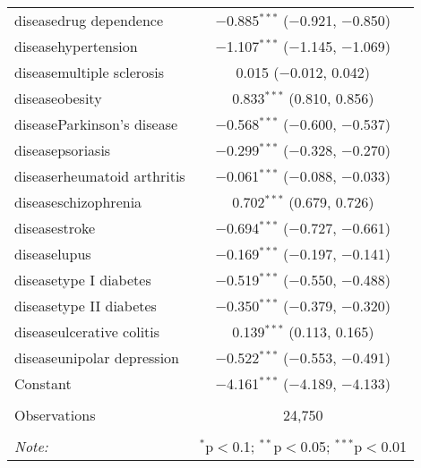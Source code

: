\begin{table}[!htbp]
\begin{tabular}{@{\extracolsep{5pt}}lc}
  diseasedrug dependence & $-$0.885$^{***}$ ($-$0.921, $-$0.850) \\ 
  diseasehypertension & $-$1.107$^{***}$ ($-$1.145, $-$1.069) \\ 
  diseasemultiple sclerosis & 0.015 ($-$0.012, 0.042) \\ 
  diseaseobesity & 0.833$^{***}$ (0.810, 0.856) \\ 
  diseaseParkinson's disease & $-$0.568$^{***}$ ($-$0.600, $-$0.537) \\ 
  diseasepsoriasis & $-$0.299$^{***}$ ($-$0.328, $-$0.270) \\ 
  diseaserheumatoid arthritis & $-$0.061$^{***}$ ($-$0.088, $-$0.033) \\ 
  diseaseschizophrenia & 0.702$^{***}$ (0.679, 0.726) \\ 
  diseasestroke & $-$0.694$^{***}$ ($-$0.727, $-$0.661) \\ 
  diseaselupus & $-$0.169$^{***}$ ($-$0.197, $-$0.141) \\ 
  diseasetype I diabetes & $-$0.519$^{***}$ ($-$0.550, $-$0.488) \\ 
  diseasetype II diabetes & $-$0.350$^{***}$ ($-$0.379, $-$0.320) \\ 
  diseaseulcerative colitis & 0.139$^{***}$ (0.113, 0.165) \\ 
  diseaseunipolar depression & $-$0.522$^{***}$ ($-$0.553, $-$0.491) \\ 
  Constant & $-$4.161$^{***}$ ($-$4.189, $-$4.133) \\ 
 \hline \\[-1.8ex] 
Observations & 24,750 \\ 
\hline 
\hline \\[-1.8ex] 
\textit{Note:}  & \multicolumn{1}{r}{$^{*}$p$<$0.1; $^{**}$p$<$0.05; $^{***}$p$<$0.01} \\ 
\end{tabular} 
\end{table} 

